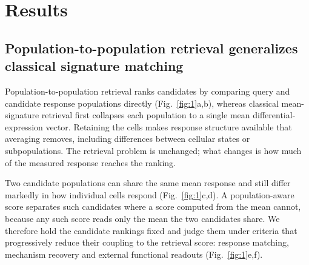 \documentclass[11pt,letterpaper]{article}
\begin{document}
\section*{Results}

\subsection*{Population-to-population retrieval generalizes classical signature matching}

Population-to-population retrieval ranks candidates by comparing query and candidate response populations directly (Fig.~\ref{fig:1}a,b), whereas classical mean-signature retrieval\cite{ref1,ref2} first collapses each population to a single mean differential-expression vector. Retaining the cells makes response structure available that averaging removes, including differences between cellular states or subpopulations. The retrieval problem is unchanged; what changes is how much of the measured response reaches the ranking.

Two candidate populations can share the same mean response and still differ markedly in how individual cells respond (Fig.~\ref{fig:1}c,d). A population-aware score separates such candidates where a score computed from the mean cannot, because any such score reads only the mean the two candidates share. We therefore hold the candidate rankings fixed and judge them under criteria that progressively reduce their coupling to the retrieval score: response matching, mechanism recovery and external functional readouts (Fig.~\ref{fig:1}e,f).
\end{document}

